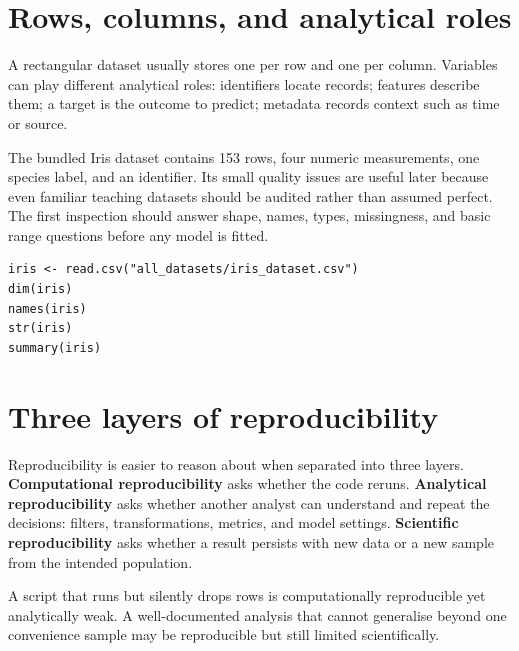 \section{Rows, columns, and analytical roles}
A rectangular dataset usually stores one  per row and one  per column. Variables can play different analytical roles: identifiers locate records; features describe them; a target is the outcome to predict; metadata records context such as time or source.

The bundled Iris dataset contains 153 rows, four numeric measurements, one species label, and an identifier. Its small quality issues are useful later because even familiar teaching datasets should be audited rather than assumed perfect. The first inspection should answer shape, names, types, missingness, and basic range questions before any model is fitted.

\begin{lstlisting}[style=utpr]
iris <- read.csv("all_datasets/iris_dataset.csv")
dim(iris)
names(iris)
str(iris)
summary(iris)
\end{lstlisting}


\section{Three layers of reproducibility}
Reproducibility is easier to reason about when separated into three layers. \textbf{Computational reproducibility} asks whether the code reruns. \textbf{Analytical reproducibility} asks whether another analyst can understand and repeat the decisions: filters, transformations, metrics, and model settings. \textbf{Scientific reproducibility} asks whether a result persists with new data or a new sample from the intended population.

A script that runs but silently drops rows is computationally reproducible yet analytically weak. A well-documented analysis that cannot generalise beyond one convenience sample may be reproducible but still limited scientifically.

